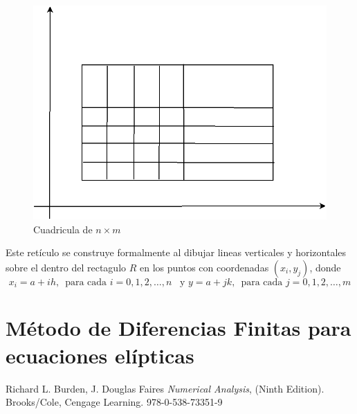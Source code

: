 \documentclass[a4paper]{article}
\begin{document}
\begin{figure}[h]
\begin{center}
\includegraphics[scale=0.29]{./lattice.png} 
\end{center} 
\caption{Cuadricula de $n\times m$}
\label{fig::fig1}
\end{figure}
Este retículo se construye formalmente al dibujar lineas verticales y horizontales sobre el dentro del rectagulo $R$ en los puntos con coordenadas $(x_i, y_j)$, donde
\begin{equation}
x_i=a+ih,\,\,\,\text{para cada }i=0,1,2,\hdots,n\,\,\, \text{ y } y=a+jk,\,\,\,\text{para cada }j=0,1,2,\hdots,m
\end{equation}


\section{Método de Diferencias Finitas para ecuaciones elípticas}



\begin{thebibliography}{99}


 Richard L. Burden, J. Douglas Faires \textit{Numerical Analysis}, (Ninth Edition). Brooks/Cole, Cengage Learning. 978-0-538-73351-9






\end{thebibliography}
\end{document}
